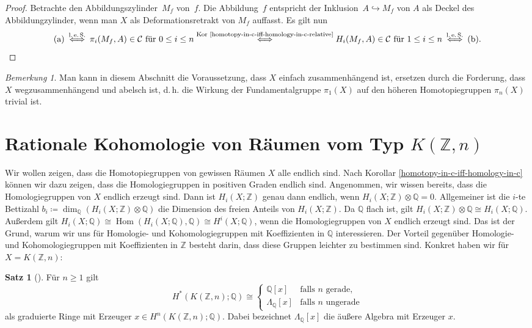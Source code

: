 \documentclass[11pt, a4paper, german]{article}
\theoremstyle{definition}
\newtheorem{satz}[lem]{Satz}
\theoremstyle{remark}
\newtheorem*{bem}{Bemerkung}
\newcommand{\Z}{\mathbb{Z}} %
\newcommand{\Q}{\mathbb{Q}} %
\DeclareMathOperator{\Hom}{Hom} %
\newcommand{\SC}{\mathcal{C}} %
\renewcommand{\dh}{d.\,h.} %
\begin{document}
\begin{proof}
  Betrachte den Abbildungszylinder~$M_f$ von~$f$.
  Die Abbildung~$f$ entspricht der Inklusion~$A \hookrightarrow M_f$ von $A$ als Deckel des Abbildungzylinder, wenn man $X$ als Deformationsretrakt von $M_f$ auffasst.
  Es gilt nun
  \[
    \text{(a)}
    \stackrel{\text{l.\,e.\,S.}}{\iff}
    \pi_i(M_f, A) \in \SC \text{ für } 0 \leq i \leq n
    \stackrel{\text{Kor \ref{homotopy-in-c-iff-homology-in-c-relative}}}{\iff}
    H_i(M_f, A) \in \SC \text{ für } 1 \leq i \leq n
    \stackrel{\text{l.\,e.\,S.}}{\iff}
    \text{(b)}.
    \qedhere
  \]
\end{proof}

\begin{bem}
  Man kann in diesem Abschnitt die Voraussetzung, dass $X$ einfach zusammenhängend ist, ersetzen durch die Forderung, dass $X$ wegzusammenhängend und abelsch ist, \dh{} die Wirkung der Fundamentalgruppe $\pi_1(X)$ auf den höheren Homotopiegruppen $\pi_n(X)$ trivial ist.
\end{bem}

\section{Rationale Kohomologie von Räumen vom Typ $K(\Z, n)$}
\label{sec:rational-cohomology}

Wir wollen zeigen, dass die Homotopiegruppen von gewissen Räumen $X$ alle endlich sind.
Nach Korollar \ref{homotopy-in-c-iff-homology-in-c} können wir dazu zeigen, dass die Homologiegruppen in positiven Graden endlich sind.
Angenommen, wir wissen bereits, dass die Homologiegruppen von $X$ endlich erzeugt sind.
Dann ist $H_i(X; \Z)$ genau dann endlich, wenn $H_i(X; \Z) \otimes \Q = 0$.
Allgemeiner ist die $i$-te Bettizahl $b_i \coloneqq \dim_\Q(H_i(X; \Z) \otimes \Q)$ die Dimension des freien Anteils von $H_i(X; \Z)$.
Da $\Q$ flach ist, gilt $H_i(X; \Z) \otimes \Q \cong H_i(X; \Q)$.
Außerdem gilt $H_i(X; \Q) \cong \Hom(H_i(X; \Q), \Q) \cong H^i(X; \Q)$, wenn die Homologiegruppen von $X$ endlich erzeugt sind.
Das ist der Grund, warum wir uns für Homologie- und Kohomologiegruppen mit Koeffizienten in $\Q$ interessieren.
Der Vorteil gegenüber Homologie- und Kohomologiegruppen mit Koeffizienten in $\Z$ besteht darin, dass diese Gruppen leichter zu bestimmen sind.
Konkret haben wir für $X = K(\Z, n)$:

\begin{satz}[{\cite[Lem 1.20]{hatcher:ss}}]\label{rational-homology-kzn}
  Für $n \geq 1$ gilt
  \vspace{-1em}
  \[
    H^*(K(\Z, n); \Q) \cong \begin{cases}
      \Q[x] & \text{falls $n$ gerade}, \\
      \Lambda_\Q[x] & \text{falls $n$ ungerade}
    \end{cases}
  \]
  als graduierte Ringe mit Erzeuger $x \in H^n(K(\Z, n); \Q)$.
  Dabei bezeichnet $\Lambda_\Q[x]$ die äußere Algebra mit Erzeuger $x$.
\end{satz}
\end{document}
